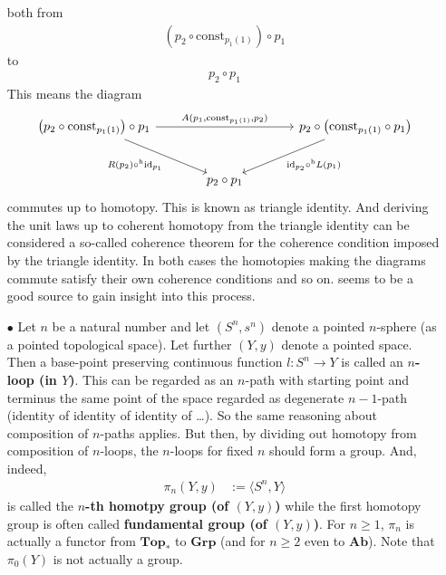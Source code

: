 \begin{enumerate}
both from
\begin{align*}
  \left(
    p_{2}
    \circ
    \mathrm{const}_{p_{1}(1)}
  \right)
  \circ
  p_{1}
\end{align*}
to
\begin{align*}
  p_{2}
  \circ
  p_{1}
\end{align*}
This means the diagram
\[
\begin{tikzcd}[sep=large]
  \left(
    p_{2}
    \circ
    \mathrm{const}_{p_{1}(1)}
  \right)
  \circ
  p_{1}
  \arrow{rr}{A(p_{1},\mathrm{const}_{p_{1}(1)},p_{2})}
  \arrow[swap]{dr}{R(p_{2}) \circ^{\textrm{h}} \mathrm{id}_{p_{1}}}
  &
  &
  p_{2}
  \circ
  \left(
    \mathrm{const}_{p_{1}(1)}
    \circ
    p_{1}
  \right)
  \arrow{dl}{\mathrm{id}_{p_{2}} \circ^{\textrm{h}} L(p_{1})}
  \\
  &
  p_{2}
  \circ
  p_{1}
  &
\end{tikzcd}
\]
commutes up to homotopy. This is known as triangle identity. And deriving the unit laws up to coherent homotopy from the triangle identity can be considered a so-called {\glqq}coherence theorem{\grqq} for the {\glqq}coherence condition{\grqq} imposed by the triangle identity. In both cases the homotopies making the diagrams {\glqq}commute{\grqq} satisfy their own coherence conditions and so on. \cite{69cbf29c} seems to be a good source to gain insight into this process.
\item[$\bullet$]
Let $n$ be a natural number and let $(S^{n},s^{n})$ denote a pointed $n$-sphere (as a pointed topological space). Let further $(Y,y)$ denote a pointed space. Then a base-point preserving continuous function $l \colon S^{n} \rightarrow Y$ is called an \textbf{$n$-loop (in $Y$)}. This can be regarded as an $n$-path with starting point and terminus the same point of the space regarded as degenerate $n-1$-path (identity of identity of identity of \ldots). So the same reasoning about composition of $n$-paths applies. But then, by dividing out homotopy from composition of $n$-loops, the $n$-loops for fixed $n$ should form a group. And, indeed,
\begin{align*}
  \pi_{n}(Y,y)
  &:=
  \langle
    S^{n},
    Y
  \rangle
\end{align*}
is called the \textbf{$n$-th homotpy group (of $(Y,y)$)} while the first homotopy group is often called \textbf{fundamental group (of $(Y,y)$)}. For $n \geq 1$, $\pi_{n}$ is actually a functor from $\mathbf{Top}_{\ast}$ to $\mathbf{Grp}$ (and for $n \geq 2$ even to $\mathbf{Ab}$). Note that $\pi_{0}(Y)$ is not actually a group.

\end{enumerate}
